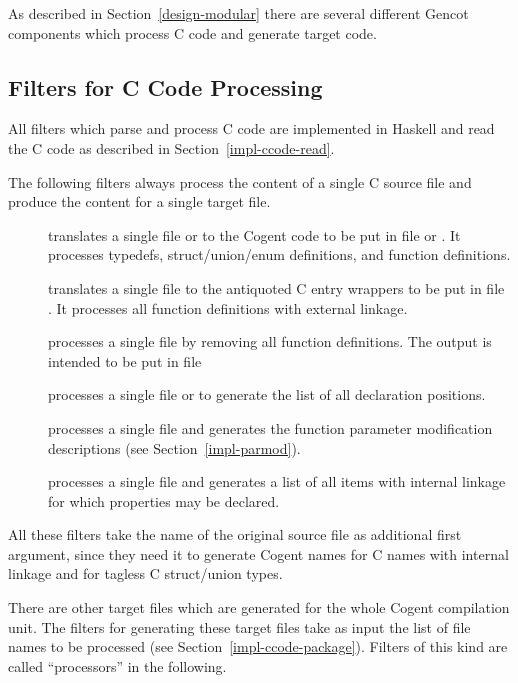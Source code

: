 As described in Section~\ref{design-modular} there are several different Gencot components which process C code and generate 
target code.

\subsection{Filters for C Code Processing}
\label{impl-ccomps-filters}

All filters which parse and process C code are implemented in Haskell and read the
C code as described in Section~\ref{impl-ccode-read}.

The following filters always process the content of a single C source file and produce the content for a single 
target file.
\begin{description}
\item[] translates a single file  or  to the Cogent code to be put in file
 or . It processes typedefs, struct/union/enum definitions, and function
definitions. 
\item[] translates a single file  to the antiquoted C entry wrappers to be put in
file . It processes all function definitions with external linkage.
\item[] processes a single file  by removing all function definitions. The output
is intended to be put in file 
\item[] processes a single file  or  to generate the list of
all declaration positions.
\item[] processes a single file  and generates the 
function parameter modification descriptions (see Section~\ref{impl-parmod}).
\item[] processes a single file  and generates a list of all items with internal linkage 
for which properties may be declared.
\end{description}

All these filters take the name of the original source file as additional first
argument, since they need it to generate Cogent names for C names with internal linkage and for tagless C struct/union
types.

There are other target files which are generated for the whole Cogent compilation unit. The filters for generating these target files 
take as input the list of file names to be processed (see Section~\ref{impl-ccode-package}). Filters of this kind 
are called ``processors'' in the following.

